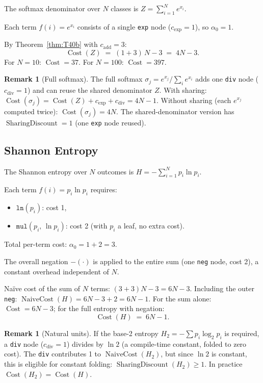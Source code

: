 \documentclass[12pt,a4paper]{article}
\theoremstyle{definition}
\newtheorem{remark}[theorem]{Remark}
\newcommand{\Cost}{\operatorname{Cost}}
\newcommand{\NC}{\operatorname{NaiveCost}}
\newcommand{\SD}{\operatorname{SharingDiscount}}
\begin{document}
The softmax denominator over $N$ classes is $Z = \sum_{i=1}^{N} e^{x_i}$.

Each term $f(i) = e^{x_i}$ consists of a single \texttt{exp} node
($c_{\exp} = 1$), so $\alpha_0 = 1$.

By Theorem~\ref{thm:T40b} with $c_{\mathrm{add}} = 3$:
\[
  \Cost(Z) \;=\; (1 + 3)\,N - 3 \;=\; 4N - 3.
\]
For $N = 10$: $\Cost = 37$.  For $N = 100$: $\Cost = 397$.

\begin{remark}[Full softmax]
The full softmax $\sigma_j = e^{x_j}/\sum_i e^{x_i}$ adds one \texttt{div}
node ($c_{\mathrm{div}} = 1$) and can reuse the shared denominator $Z$.
With sharing: $\Cost(\sigma_j) = \Cost(Z) + c_{\exp} + c_{\mathrm{div}} = 4N - 1$.
Without sharing (each $e^{x_j}$ computed twice): $\Cost(\sigma_j) = 4N$.
The shared-denominator version has $\SD = 1$ (one \texttt{exp} node reused).
\end{remark}

\subsection{Shannon Entropy}

The Shannon entropy over $N$ outcomes is
$H = -\sum_{i=1}^{N} p_i \ln p_i$.

Each term $f(i) = p_i \ln p_i$ requires:
\begin{itemize}
  \item $\texttt{ln}(p_i)$: cost 1,
  \item $\texttt{mul}(p_i,\, \ln p_i)$: cost 2 (with $p_i$ a leaf, no extra cost).
\end{itemize}
Total per-term cost: $\alpha_0 = 1 + 2 = 3$.

The overall negation $-(\cdot)$ is applied to the entire sum (one
\texttt{neg} node, cost 2), a constant overhead independent of $N$.

Na\"{i}ve cost of the sum of $N$ terms: $(3 + 3)N - 3 = 6N - 3$.
Including the outer \texttt{neg}: $\NC(H) = 6N - 3 + 2 = 6N - 1$.
For the sum alone: $\Cost = 6N - 3$; for the full entropy with negation:
\[
  \Cost(H) \;=\; 6N - 1.
\]

\begin{remark}[Natural units]
If the base-2 entropy $H_2 = -\sum p_i \log_2 p_i$ is required, a
\texttt{div} node ($c_{\mathrm{div}} = 1$) divides by $\ln 2$ (a compile-time
constant, folded to zero cost).  The \texttt{div} contributes 1 to
$\NC(H_2)$, but since $\ln 2$ is constant, this is eligible for constant
folding: $\SD(H_2) \geq 1$.  In practice $\Cost(H_2) = \Cost(H)$.
\end{remark}
\end{document}
